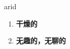 
\begin{frame}
{\huge arid}
\begin{center}
\begin{enumerate}\Large
  \item \textbf{干燥的}
  \item \textbf{无趣的，无聊的}
\end{enumerate}
\end{center}
\end{frame}
